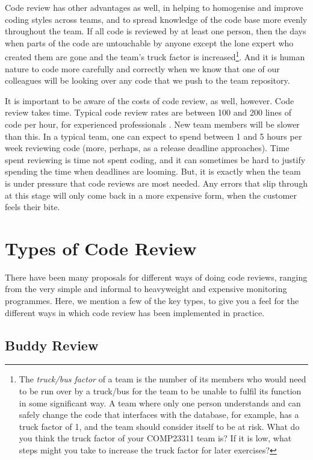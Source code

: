 \documentclass[
]{book}
\begin{document}
Code review has other advantages as well, in helping to homogenise and improve coding styles across teams, and to spread knowledge of the code base more evenly throughout the team. If all code is reviewed by at least one person, then the days when parts of the code are untouchable by anyone except the lone expert who created them are gone and the team's truck factor is increased\footnote{The \emph{truck/bus factor} of a team is the number of its members who would need to be run over by a truck/bus for the team to be unable to fulfil its function in some significant way. A team where only one person understands and can safely change the code that interfaces with the database, for example, has a truck factor of 1, and the team should consider itself to be at risk. What do you think the truck factor of your COMP23311 team is? If it is low, what steps might you take to increase the truck factor for later exercises?}. And it is human nature to code more carefully and correctly when we know that one of our colleagues will be looking over any code that we push to the team repository.

It is important to be aware of the costs of code review, as well, however. Code review takes time. Typical code review rates are between 100 and 200 lines of code per hour, for experienced professionals \citep{kemerer, bisant}. New team members will be slower than this. In a typical team, one can expect to spend between 1 and 5 hours per week reviewing code (more, perhaps, as a release deadline approaches). Time spent reviewing is time not spent coding, and it can sometimes be hard to justify spending the time when deadlines are looming. But, it is exactly when the team is under pressure that code reviews are most needed. Any errors that slip through at this stage will only come back in a more expensive form, when the customer feels their bite.

\hypertarget{crtypes}{%
\section{Types of Code Review}\label{crtypes}}

There have been many proposals for different ways of doing code reviews, ranging from the very simple and informal to heavyweight and expensive monitoring programmes. Here, we mention a few of the key types, to give you a feel for the different ways in which code review has been implemented in practice.

\hypertarget{buddy}{%
\subsection{Buddy Review}\label{buddy}}
\end{document}
